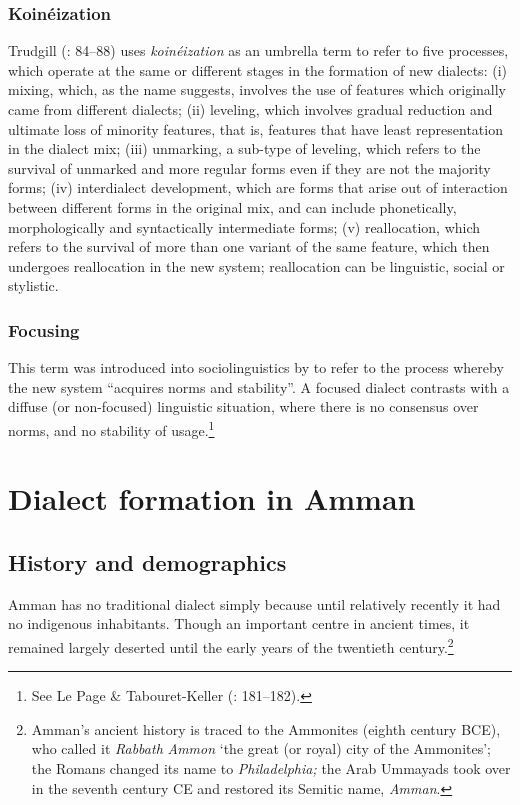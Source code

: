 \documentclass[output=paper]{langsci/langscibook}
\begin{document}
\subsubsection{Koinéization}

Trudgill (\citeyear{Trudgill2004}: 84–88) uses \textit{koinéization} as an umbrella term to refer to five processes, which operate at the same or different stages in the formation of new dialects: (i) mixing, which, as the name suggests, involves the use of features which originally came from different dialects; (ii) leveling, which involves gradual reduction and ultimate loss of minority features, that is, features that have least representation in the dialect mix; (iii) unmarking, a sub-type of leveling, which refers to the survival of unmarked and more regular forms even if they are not the majority forms; (iv) interdialect development, which are forms that arise out of interaction between different forms in the original mix, and can include phonetically, morphologically and syntactically  intermediate forms; (v) reallocation, which refers to the survival of more than one variant of the same feature, which then undergoes reallocation in the new system; reallocation can be linguistic, social or stylistic.

\subsubsection{Focusing} \label{focussec}

This term was introduced into sociolinguistics by \citet{LePageTabouret-Keller1985} to refer to the process whereby the new system “acquires norms and stability”. A focused dialect contrasts with a diffuse (or non-focused) linguistic situation, where there is no consensus over norms, and no stability of usage.\footnote{See Le Page \& Tabouret-Keller (\citeyear{LePageTabouret-Keller1985}: 181–182).}

\section{Dialect formation in Amman}

\subsection{History and demographics}

Amman has no traditional dialect simply because until relatively recently it had no indigenous inhabitants. Though an important centre in ancient times, it remained largely deserted until the early years of the twentieth century.\footnote{Amman’s ancient history is traced to the Ammonites (eighth century BCE), who called it \textit{Rabbath} \textit{Ammon} ‘the great (or royal) city of the Ammonites’; the Romans changed its name to \textit{Philadelphia;} the Arab Ummayads took over in the seventh century CE and restored its Semitic name, \textit{Amman}.}
\end{document}
